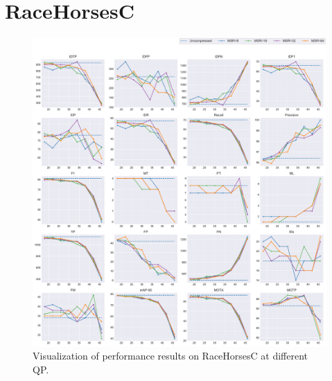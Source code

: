 
\section{RaceHorsesC}
\label{sec:appendix/RaceHorsesC_all}


\begin{figure}[!htbp]
\centering
\includegraphics[width=1.0\linewidth]{img/appendix/RaceHorsesC_all_multiplots_qp.pdf}
\caption[Visualization of performance results on RaceHorsesC at different QP]
{Visualization of performance results on RaceHorsesC at different QP.}
\label{fig:RaceHorsesC_all_qp}
\end{figure}

